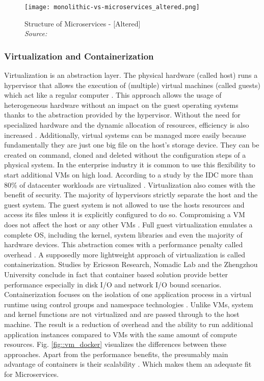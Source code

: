 \documentclass[12pt, a4paper]{article}
\begin{document}
        \begin{figure}
            \centering
            \texttt{[image: monolithic-vs-microservices\_altered.png]}
            \caption{Structure of Microservices - [Altered] \\\textit{Source:~\cite{redhat_micro}}}\label{fig::micro}
        \end{figure}

        \subsubsection{Virtualization and Containerization}
        Virtualization is an abstraction layer. The physical hardware (called host) runs a hypervisor that allows the execution of (multiple) virtual machines (called guests) which act like a regular computer \cite{vmbasics}. This approach allows the usage of heterogeneous hardware without an impact on the guest operating systems thanks to the abstraction provided by the hypervisor. Without the need for specialized hardware and the dynamic allocation of resources, efficiency is also increased \cite{redhat_venv}. Additionally, virtual systems can be managed more easily because fundamentally they are just one big file on the host's storage device. They can be created on command, cloned and deleted without the configuration steps of a physical system. In the enterprise industry it is common to use this flexibility to start additional \ac{VM}s on high load. According to a study by the \ac{IDC} more than 80\% of datacenter workloads are virtualized \cite{virtualaddoption}. Virtualization also comes with the benefit of security. The majority of hypervisors strictly separate the host and the guest system. The guest system is not allowed to use the hosts resources and access its files unless it is explicitly configured to do so. Compromising a \ac{VM} does not affect the host or any other \ac{VM}s \cite{redhat_venv}.\newline
        Full guest virtualization emulates a complete \ac{OS}, including the kernel, system libraries and even the majority of hardware devices. This abstraction comes with a performance penalty called overhead \cite{vmbasics}. A supposedly more lightweight approach of virtualization is called containerization. Studies by Ericsson Research, Nomadic Lab \cite{ieee_perfomance} and the Zhengzhou University \cite{zhengzhou_university} conclude in fact that container based solution provide better performance especially in disk \acs{I/O} and network \acs{I/O} bound scenarios. Containerization focuses on the isolation of one application process in a virtual runtime using control groups and namespace technologies \cite{cgroups}. Unlike \ac{VM}s, system and kernel functions are not virtualized and are passed through to the host machine. The result is a reduction of overhead and the ability to run additional application instances compared to \ac{VM}s with the same amount of compute resources. Fig. \ref{fig::vm_docker} visualizes the differences between these approaches.\newline
        Apart from the performance benefits, the presumably main advantage of containers is their scalability \cite{cintainer_scale}. Which makes them an adequate fit for Microservices.
\end{document}
